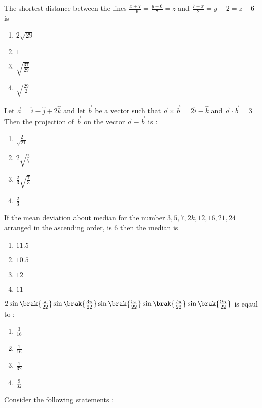 
\iffalse
  \title{2022}
  \author{Murra Rajesh Kumar Reddy}
  \section{mcq-single}
\fi
\item The shortest distance between the lines $\frac{x+7}{-6} = \frac{y-6}{7} = z$ and $\frac{7-x}{2} = y-2 = z-6$ is 
\begin{enumerate}
\item $2\sqrt{29}$
\item $1$
\item $\sqrt{\frac{37}{29}}$
\item $\sqrt{\frac{29}{2}}$
\end{enumerate}
\item Let $\vec{a} = \hat{i}-\hat{j}+2\hat{k}$ and let $\vec{b}$ be a vector such that $\vec{a} \times \vec{b} = 2\hat{i}-\hat{k}$ and $\vec{a} \cdot \vec{b} = 3$ Then the projection of $\vec{b}$ on the vector $\vec{a}-\vec{b}$ is :
\begin{enumerate}
\item $\frac{2}{\sqrt{21}}$
\item $2\sqrt{\frac{3}{7}}$
\item $\frac{2}{3}\sqrt{\frac{7}{3}}$
\item $\frac{2}{3}$
\end{enumerate}
\item If the mean deviation about median for the number $3,5,7,2k,12,16,21,24$ arranged in the ascending order, is 6 then the median is
\begin{enumerate}
\item $11.5$
\item $10.5$
\item $12$
\item $11$
\end{enumerate}
\item $2\sin\brak{\frac{\pi}{22}}\sin\brak{\frac{3\pi}{22}}\sin\brak{\frac{5\pi}{22}}\sin\brak{\frac{7\pi}{22}}\sin\brak{\frac{9\pi}{22}}$ is eqaul to :
\begin{enumerate}
\item $\frac{3}{16}$
\item $\frac{1}{16}$
\item $\frac{1}{32}$
\item $\frac{9}{32}$
\end{enumerate}
\item Consider the following statements : \\
